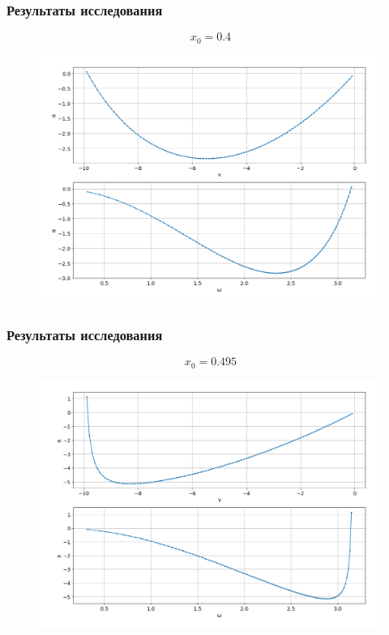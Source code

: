 \documentclass[fullscreen=true, unicode, bookmarks=false]{beamer}
\begin{document}
\begin{frame}
\frametitle{ Результаты исследования } 

{\tiny  $$ x_0 = 0.4 $$}
\vspace{-0.8cm}
\begin{figure}
\includegraphics[scale=0.35]{0,4.png} 
\end{figure}

\end{frame}

\begin{frame}
\frametitle{ Результаты исследования } 

{\tiny  $$ x_0 = 0.495 $$}
\vspace{-0.8cm}
\begin{figure}
\includegraphics[scale=0.35]{0,495.png} 
\end{figure}

\end{frame}
\end{document}
